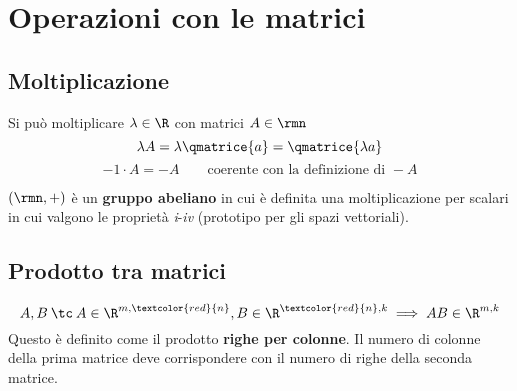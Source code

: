 {
	\renewcommand{\headrulewidth}{0pt}
}

\thispagestyle{ciccio}

\section{Operazioni con le matrici}
\subsection{Moltiplicazione}

Si può moltiplicare $\lambda \in \R$ con matrici $A\in\rmn$
\[
\lambda A=\lambda\qmatrice{a}=\qmatrice{\lambda a}
\]
\[
-1\cdot A = -A\qquad\text{coerente con la definizione di }-A
\]

\esempio{
\[
2\begin{pmatrix}
3 & 1 & 0\\
-1 & 4 & 1
\end{pmatrix}=\begin{pmatrix}
6 & 2 & 0\\
-2 & 8 & 2
\end{pmatrix}
\]
}



$(\rmn, +)$ è un \textbf{gruppo abeliano} in cui è definita una moltiplicazione per scalari in cui valgono le proprietà \textit{i}-\textit{iv} (prototipo per gli spazi vettoriali).

\subsection{Prodotto tra matrici}
\[
A,B\:\tc\: A\in\R^{m,\textcolor{red}{n}}, B\in\R^{\textcolor{red}{n}, k}\implies AB\in \R^{m, k}
\]
Questo è definito come il prodotto \textbf{righe per colonne}. Il numero di colonne della prima matrice deve corrispondere con il numero di righe della seconda matrice.

